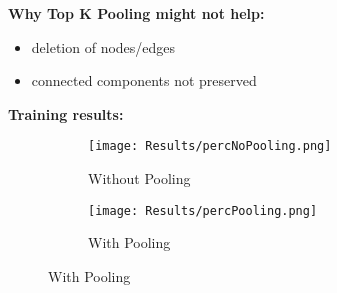 \textbf{Why Top K Pooling might not help:} 
\begin{itemize}
    \item deletion of nodes/edges
    \item connected components not preserved
\end{itemize}
\textbf{Training results:}
\begin{figure}[h]
    \centering
    \begin{subfigure}[t]{0.45\textwidth}
        \centering
        \texttt{[image: Results/percNoPooling.png]}
        \caption{Without Pooling}
    \end{subfigure}
    \hfill
    \begin{subfigure}[t]{0.45\textwidth}
        \centering
        \texttt{[image: Results/percPooling.png]}
        \caption{With Pooling}
    \end{subfigure}
\end{figure}
